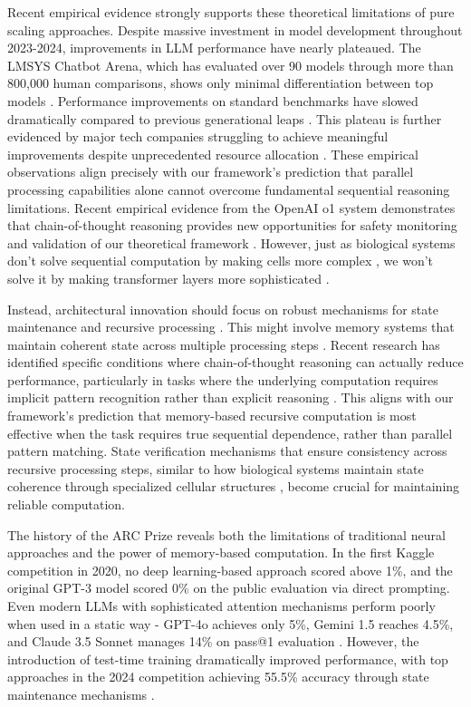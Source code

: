 \documentclass[12pt]{article}
\begin{document}
Recent empirical evidence strongly supports these theoretical limitations of pure scaling approaches.
Despite massive investment in model development throughout 2023-2024, improvements in LLM performance have nearly plateaued.
The LMSYS Chatbot Arena, which has evaluated over 90 models through more than 800,000 human comparisons, shows only minimal differentiation between top models \cite{lmsys2024arena}.
Performance improvements on standard benchmarks have slowed dramatically compared to previous generational leaps \cite{marcus2024evidence}.
This plateau is further evidenced by major tech companies struggling to achieve meaningful improvements despite unprecedented resource allocation \cite{zuo2024plateau}.
These empirical observations align precisely with our framework's prediction that parallel processing capabilities alone cannot overcome fundamental sequential reasoning limitations.
Recent empirical evidence from the OpenAI o1 system demonstrates that chain-of-thought reasoning provides new opportunities for safety monitoring and validation of our theoretical framework \cite{openai2024o1}.
However, just as biological systems don't solve sequential computation by making cells more complex \cite{wang2023parallel}, we won't solve it by making transformer layers more sophisticated \cite{zhao2024epha}.

Instead, architectural innovation should focus on robust mechanisms for state maintenance and recursive processing \cite{jung2020new}.
This might involve memory systems that maintain coherent state across multiple processing steps \cite{zhu2024overcoming}.
Recent research has identified specific conditions where chain-of-thought reasoning can actually reduce performance, particularly in tasks where the underlying computation requires implicit pattern recognition rather than explicit reasoning \cite{liu2024mind}.
This aligns with our framework's prediction that memory-based recursive computation is most effective when the task requires true sequential dependence, rather than parallel pattern matching.
State verification mechanisms that ensure consistency across recursive processing steps, similar to how biological systems maintain state coherence through specialized cellular structures \cite{espinosa2024molecular}, become crucial for maintaining reliable computation.

The history of the ARC Prize reveals both the limitations of traditional neural approaches and the power of memory-based computation. In the first Kaggle competition in 2020, no deep learning-based approach scored above 1\%, and the original GPT-3 model scored 0\% on the public evaluation via direct prompting. Even modern LLMs with sophisticated attention mechanisms perform poorly when used in a static way - GPT-4o achieves only 5\%, Gemini 1.5 reaches 4.5\%, and Claude 3.5 Sonnet manages 14\% on pass@1 evaluation \cite{chollet2024arc}. However, the introduction of test-time training dramatically improved performance, with top approaches in the 2024 competition achieving 55.5\% accuracy through state maintenance mechanisms \cite{chollet2024arc}.
\end{document}
